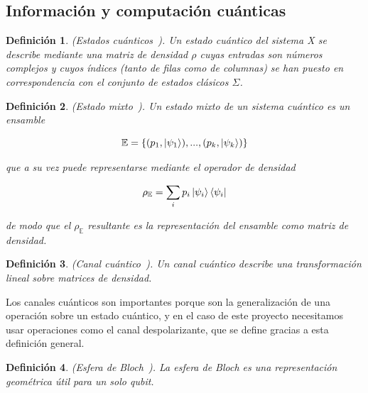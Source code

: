 \documentclass{ieeeaccess}
\newtheorem{definition}{Definición}[section]
\begin{document}
\subsection{Información y computación cuánticas}

\begin{definition}
    (Estados cuánticos~\cite{watrous_quantum_channels}). Un estado cuántico del sistema X se describe mediante una matriz de densidad $\rho$ cuyas entradas son números complejos y cuyos índices (tanto de filas como de columnas) se han puesto en correspondencia con el conjunto de estados clásicos $\Sigma$.
    \label{def:quantum_state}
\end{definition}

\begin{definition}
    (Estado mixto~\cite{zhou2017differential}). Un estado mixto de un sistema cuántico es un ensamble

    \[
      \mathbb{E} = \{(p_1,\ket{\psi_1}),...,(p_k,\ket{\psi_k})\}
    \]

    que a su vez puede representarse mediante el operador de densidad

    \[
      \rho_{\mathbb{E}} = \sum_{i}p_i\ket{\psi_i}\bra{\psi_i}
    \]

    de modo que el $\rho_{\mathbb{E}}$ resultante es la representación del ensamble como matriz de densidad.
    \label{def:mixed_state}
\end{definition}

\begin{definition}
    (Canal cuántico~\cite{watrous_quantum_channels}). Un canal cuántico describe una transformación lineal sobre matrices de densidad.
    \label{def:quantum_channel}
\end{definition}

Los canales cuánticos son importantes porque son la generalización de una operación sobre un estado cuántico, y en el caso de este proyecto necesitamos usar operaciones como el canal despolarizante, que se define gracias a esta definición general.

\begin{definition}
    (Esfera de Bloch~\cite{watrous_quantum_channels}). La esfera de Bloch es una representación geométrica útil para un solo qubit.
    \label{def:bloch_sphere}
\end{definition}
\end{document}
